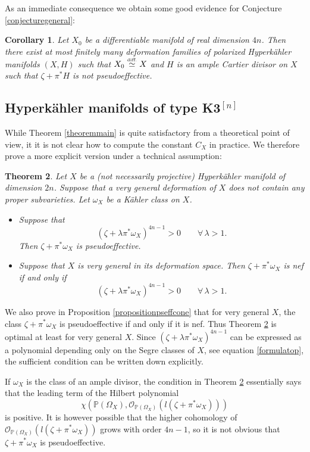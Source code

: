 \documentclass[JEP,XML,SOM,Unicode,NoEqCountersInSection,published]{cedram}
\let\mathcal\mathscr
\theoremstyle{plain}
\newtheorem{theorem}{Theorem}[section]
\newtheorem{corollary}[theorem]{Corollary}
\theoremstyle{definition}
\newcommand{\PP}{\ensuremath{\mathbb{P}}}
\newcommand\sO{{\mathcal O}}
\begin{document}
As an immediate consequence we obtain some good evidence for Conjecture \ref{conjecturegeneral}:

\begin{corollary} \label{corollarygoodevidence}
Let $X_0$ be a differentiable manifold of real dimension $4n$. Then there exist
at most finitely many deformation families of polarized Hyperkähler manifolds $(X, H)$
such that $X_0 \stackrel{\mbox{\tiny diff.}}{\simeq} X$ and $H$ is an ample Cartier divisor on $X$ such that $\zeta + \pi^* H$
is not pseudoeffective.
\end{corollary}

\subsection{Hyperkähler manifolds of type K3$^{[n]}$}

While Theorem \ref{theoremmain} is quite satisfactory from a theoretical point of view, it
it is not clear how to compute the constant $C_X$ in practice. We therefore prove a more explicit version
under a technical assumption:

\begin{theorem}\label{theoremHK}
Let $X$ be a (not necessarily projective) Hyperkähler manifold of dimension $2n$.
Suppose that a very general deformation of $X$ does not contain any proper subvarieties.
Let $\omega_X$ be a Kähler class on $X$.
\begin{itemize}
\item Suppose that
\[
(\zeta + \lambda \pi^* \omega_X)^{4n-1} > 0 \qquad \forall\,\lambda > 1.
\]
Then $\zeta+\pi^*\omega_X$ is pseudoeffective.
\item Suppose that $X$ is very general in its deformation space. Then
$\zeta+\pi^*\omega_X$ is nef if and only if
\[
(\zeta + \lambda \pi^* \omega_X)^{4n-1} > 0 \qquad \forall\,\lambda > 1.
\]
\end{itemize}
\end{theorem}

We also prove in Proposition \ref{propositionpseffcone} that for very general $X$, the class
$\zeta+\pi^*\omega_X$ is pseudoeffective if and only if it is nef. Thus Theorem \ref{theoremHK} is optimal at least
for very general $X$. Since $(\zeta + \lambda \pi^* \omega_X)^{4n-1}$ can be expressed as a polynomial depending only on the Segre classes of $X$, see equation \eqref{formulatop}, the sufficient condition
can be written down explicitly.

If $\omega_X$ is the class of an ample divisor, the condition in
Theorem \ref{theoremHK} essentially says that the leading term of the Hilbert polynomial
\[
\chi(\PP(\Omega_X), \sO_{\PP(\Omega_X)}(l(\zeta + \pi^* \omega_X)))
\]
is positive. It is however possible that the higher cohomology of $\sO_{\PP(\Omega_X)}(l(\zeta + \pi^* \omega_X))$ grows with order $4n-1$, so it is not obvious
that $\zeta + \pi^* \omega_X$ is pseudoeffective.
\end{document}
